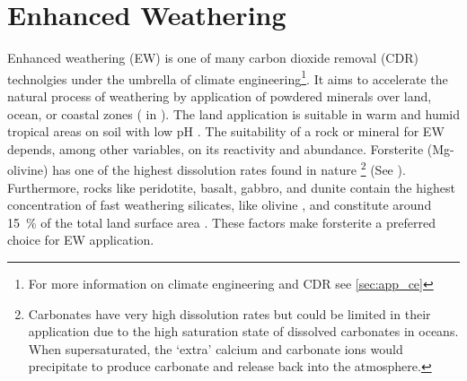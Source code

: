 \section{Enhanced Weathering}
Enhanced weathering (EW) is one of many carbon dioxide removal (CDR) technolgies under the umbrella of climate engineering\footnote{For more information on climate engineering and CDR see \cref{sec:app_ce}}. It aims to accelerate the natural process of weathering by application of powdered minerals over land, ocean, or coastal zones (\citep{schuiling2006,hangx2009} in \cite{renforth2015}). The land application is suitable in warm and humid tropical areas on soil with low pH \citep{schuiling2006,kohler2010}. The suitability of a rock or mineral for EW depends, among other variables, on its reactivity and abundance. Forsterite (Mg-olivine) has one of the highest dissolution rates found in nature \footnote{Carbonates have very high dissolution rates but could be limited in their application due to the high saturation state of dissolved carbonates in oceans. When supersaturated, the `extra' calcium and carbonate ions would precipitate to produce carbonate and release  back into the atmosphere.} (See ). Furthermore, rocks like peridotite, basalt, gabbro, and dunite contain the highest concentration of fast weathering silicates, like olivine \citep{hartmann2013}, and constitute around \SI{15}{\percent} of the total land surface area \citep{meybeck1987,hartmann2012}. These factors make forsterite a preferred choice for EW application.

